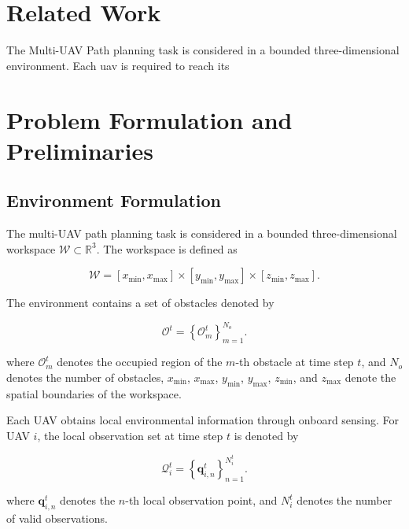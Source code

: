 \section{Related Work}

The Multi-UAV Path planning task is considered in a bounded three-dimensional environment. Each uav is required to reach its

\section{Problem Formulation and  Preliminaries}

\subsection{Environment Formulation}

The multi-UAV path planning task is considered in a bounded three-dimensional workspace 
$\mathcal{W}\subset\mathbb{R}^3$. 
The workspace is defined as

\begin{equation}
    \label{eq:workspace}
    \mathcal{W}
    =
    [x_{\min},x_{\max}]
    \times
    [y_{\min},y_{\max}]
    \times
    [z_{\min},z_{\max}].
\end{equation}

The environment contains a set of obstacles denoted by

\begin{equation}
    \label{eq:obstacle_set}
    \mathcal{O}^{t}
    =
    \left\{
    \mathcal{O}_{m}^{t}
    \right\}_{m=1}^{N_o}.
\end{equation}

\noindent
where $\mathcal{O}_{m}^{t}$ denotes the occupied region of the $m$-th obstacle at time step $t$, and $N_o$ denotes the number of obstacles, $x_{\min}$, $x_{\max}$, $y_{\min}$, $y_{\max}$, $z_{\min}$, and $z_{\max}$ denote the spatial boundaries of the workspace.

Each UAV obtains local environmental information through onboard sensing. 
For UAV $i$, the local observation set at time step $t$ is denoted by

\begin{equation}
    \label{eq:local_observation_set}
    \mathcal{Q}_{i}^{t}
    =
    \left\{
    \mathbf{q}_{i,n}^{t}
    \right\}_{n=1}^{N_i^t}.
\end{equation}

\noindent
where $\mathbf{q}_{i,n}^{t}$ denotes the $n$-th local observation point, and $N_i^t$ denotes the number of valid observations.

